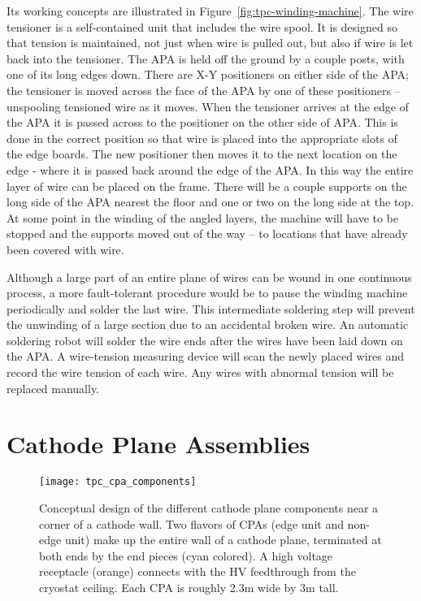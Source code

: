 Its working concepts are illustrated in Figure~\ref{fig:tpc-winding-machine}. 
The wire tensioner is a self-contained unit that includes the wire spool.  It is designed so that tension is maintained, not just when wire is pulled out, but also if wire is let back into the tensioner.  The APA is held off the ground by a couple posts, with one of its long edges down.  There are X-Y positioners on either side of the APA; the tensioner is moved across the face of the APA by one of these positioners – unspooling tensioned wire as it moves.  When the tensioner arrives at the edge of the APA it is passed across to the positioner on the other side of APA.  This is done in the correct position so that wire is placed into the appropriate slots of the edge boards. The new positioner then moves it to the next location on the edge - where it is passed back around the edge of the APA.  In this way the entire layer of wire can be placed on the frame.  There will be a couple supports on the long side of the APA nearest the floor and one or two on the long side at the top.  At some point in the winding of the angled layers, the machine will have to be stopped and the supports moved out of the way -- to locations that have already been covered with wire.

Although a large part of an entire plane of wires can be wound in one continuous process, a more fault-tolerant procedure would be to pause the winding machine periodically and solder the last wire. This intermediate soldering step will prevent the unwinding of a large section due to an accidental broken wire.  An automatic soldering robot will solder the wire ends after the wires have been laid down on the APA. A wire-tension measuring device will scan the newly placed wires and record the wire tension of each wire. Any wires with abnormal tension will be replaced manually.



\section{Cathode Plane Assemblies}
\label{subsec:v5-tpc-chamber-cathode}

\begin{figure}[t]
\centering
\texttt{[image: tpc\_cpa\_components]}
\caption[Conceptual design of the cathode plane assembly]{Conceptual design of the different cathode plane components near a corner of a cathode wall.  Two flavors of CPAs (edge unit and non-edge unit) make up the entire wall of a cathode plane, terminated at both ends by the end pieces (cyan colored).  A high voltage receptacle (orange) connects with the HV feedthrough from the cryostat ceiling. Each CPA is roughly 2.3m wide by 3m tall. }
\label{fig:tpc-cathode-model}
\end{figure}


